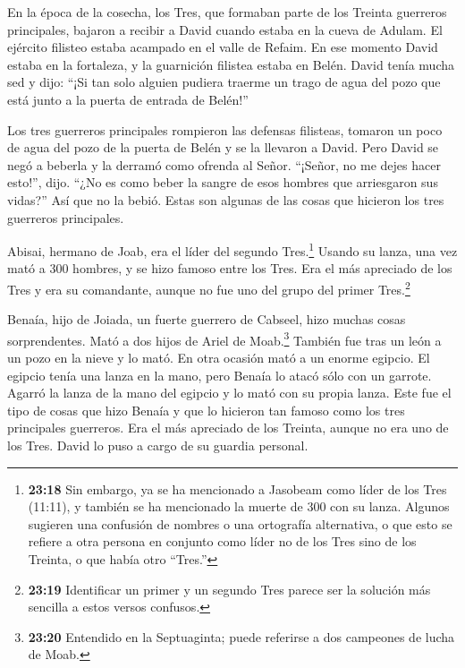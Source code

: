  En la época de la cosecha, los Tres, que formaban parte de
los Treinta guerreros principales, bajaron a recibir a David cuando
estaba en la cueva de Adulam. El ejército filisteo estaba acampado en el
valle de Refaim.  En ese momento David estaba en la
fortaleza, y la guarnición filistea estaba en Belén.  David
tenía mucha sed y dijo: ``¡Si tan solo alguien pudiera traerme un trago
de agua del pozo que está junto a la puerta de entrada de Belén!''

 Los tres guerreros principales rompieron las defensas
filisteas, tomaron un poco de agua del pozo de la puerta de Belén y se
la llevaron a David. Pero David se negó a beberla y la derramó como
ofrenda al Señor.  ``¡Señor, no me dejes hacer esto!'',
dijo. ``¿No es como beber la sangre de esos hombres que arriesgaron sus
vidas?'' Así que no la bebió. Estas son algunas de las cosas que
hicieron los tres guerreros principales.

 Abisai, hermano de Joab, era el líder del segundo
Tres.\footnote{\textbf{23:18} Sin embargo, ya se ha mencionado a
  Jasobeam como líder de los Tres (11:11), y también se ha mencionado la
  muerte de 300 con su lanza. Algunos sugieren una confusión de nombres
  o una ortografía alternativa, o que esto se refiere a otra persona en
  conjunto como líder no de los Tres sino de los Treinta, o que había
  otro ``Tres.''} Usando su lanza, una vez mató a 300 hombres, y se hizo
famoso entre los Tres.  Era el más apreciado de los Tres y
era su comandante, aunque no fue uno del grupo del primer
Tres.\footnote{\textbf{23:19} Identificar un primer y un segundo Tres
  parece ser la solución más sencilla a estos versos confusos.}

 Benaía, hijo de Joiada, un fuerte guerrero de Cabseel,
hizo muchas cosas sorprendentes. Mató a dos hijos de Ariel de
Moab.\footnote{\textbf{23:20} Entendido en la Septuaginta; puede
  referirse a dos campeones de lucha de Moab.} También fue tras un león
a un pozo en la nieve y lo mató.  En otra ocasión mató a un
enorme egipcio. El egipcio tenía una lanza en la mano, pero Benaía lo
atacó sólo con un garrote. Agarró la lanza de la mano del egipcio y lo
mató con su propia lanza.  Este fue el tipo de cosas que
hizo Benaía y que lo hicieron tan famoso como los tres principales
guerreros.  Era el más apreciado de los Treinta, aunque no
era uno de los Tres. David lo puso a cargo de su guardia personal.

